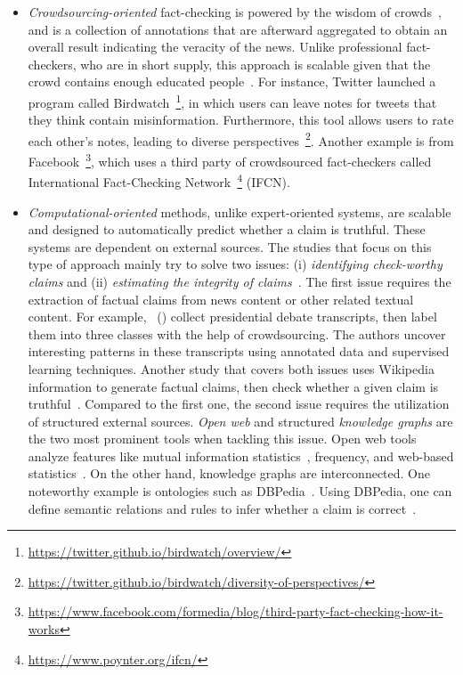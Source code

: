 \begin{description}
\begin{itemize}
        \item \emph{Crowdsourcing-oriented} fact-checking is powered by the wisdom of crowds~\parencite{WisdomOfCrowds_Galton}, and is a collection of annotations that are afterward aggregated to obtain an overall result indicating the veracity of the news. Unlike professional fact-checkers, who are in short supply, this approach is scalable given that the crowd contains enough educated people~\parencite{ScalingUpFactChecking_Allen}.  For instance, Twitter launched a program called Birdwatch~\footnote{\url{https://twitter.github.io/birdwatch/overview/}}, in which users can leave notes for tweets that they think contain misinformation. Furthermore, this tool allows users to rate each other’s notes, leading to diverse perspectives~\footnote{\url{https://twitter.github.io/birdwatch/diversity-of-perspectives/}}. Another example is from Facebook~\footnote{\url{https://www.facebook.com/formedia/blog/third-party-fact-checking-how-it-works}}, which uses a third party of crowdsourced fact-checkers called International Fact-Checking Network~\footnote{\url{https://www.poynter.org/ifcn/}} (IFCN).
        \item \emph{Computational-oriented} methods, unlike expert-oriented systems, are scalable and designed to automatically predict whether a claim is truthful. These systems are dependent on external sources. The studies that focus on this type of approach mainly try to solve two issues: (i) \emph{identifying check-worthy claims} and (ii) \emph{estimating the integrity of claims}~\parencite{FakeNewsDetectionOnSocialMediaADataMiningPerspective_Shu}. The first issue requires the extraction of factual claims from news content or other related textual content. For example,~\citeauthor{DetectingCheckWorthyClaims_Hassan} (\citeyear{DetectingCheckWorthyClaims_Hassan}) collect presidential debate transcripts, then label them into three classes with the help of crowdsourcing. The authors uncover interesting patterns in these transcripts using annotated data and supervised learning techniques. Another study that covers both issues uses Wikipedia information to generate factual claims, then check whether a given claim is truthful~\parencite{FEVER_Thorne}. Compared to the first one, the second issue requires the utilization of structured external sources. \emph{Open web} and structured \emph{knowledge graphs} are the two most prominent tools when tackling this issue. Open web tools analyze features like mutual information statistics~\parencite{UnsupervisedNamedEntityExtraction_Etzioni}, frequency, and web-based statistics~\parencite{WebBasedStatisticalFactChecking_Magdy}.  On the other hand, knowledge graphs are interconnected. One noteworthy example is ontologies such as DBPedia~\parencite{DBPedia_Auer}. Using DBPedia, one can define semantic relations and rules to infer whether a claim is correct~\parencite{SemanticFakeNewsDetection_Bracsoveanu}.
    \end{itemize}
\end{description}
